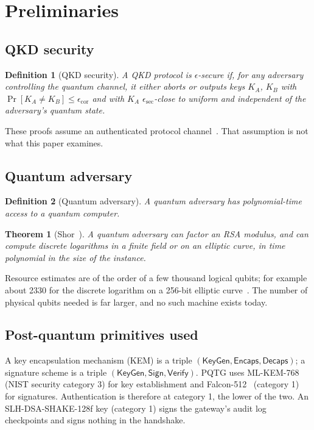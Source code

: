 \documentclass[11pt,letterpaper]{article}
\newtheorem{theorem}{Theorem}
\newtheorem{definition}{Definition}
\begin{document}
\section{Preliminaries}

\subsection{QKD security}

\begin{definition}[QKD security]
A QKD protocol is $\epsilon$-secure if, for any adversary controlling the quantum channel, it either aborts or outputs keys $K_A$, $K_B$ with $\Pr[K_A \neq K_B] \leq \epsilon_{\text{cor}}$ and with $K_A$ $\epsilon_{\text{sec}}$-close to uniform and independent of the adversary's quantum state.
\end{definition}

These proofs assume an authenticated protocol channel~\cite{shor2000simple}. That assumption is not what this paper examines.

\subsection{Quantum adversary}

\begin{definition}[Quantum adversary]
A quantum adversary has polynomial-time access to a quantum computer.
\end{definition}

\begin{theorem}[Shor~\cite{shor1997polynomial}]
\label{thm:shor}
A quantum adversary can factor an RSA modulus, and can compute discrete logarithms in a finite field or on an elliptic curve, in time polynomial in the size of the instance.
\end{theorem}

Resource estimates are of the order of a few thousand logical qubits; for example about 2330 for the discrete logarithm on a 256-bit elliptic curve~\cite{roetteler2017quantum}. The number of physical qubits needed is far larger, and no such machine exists today.

\subsection{Post-quantum primitives used}

A key encapsulation mechanism (KEM) is a triple $(\mathsf{KeyGen}, \mathsf{Encaps}, \mathsf{Decaps})$; a signature scheme is a triple $(\mathsf{KeyGen}, \mathsf{Sign}, \mathsf{Verify})$. PQTG uses ML-KEM-768~\cite{nist2024pqc} (NIST security category 3) for key establishment and Falcon-512~\cite{pornin2019falcon} (category 1) for signatures. Authentication is therefore at category 1, the lower of the two. An SLH-DSA-SHAKE-128f key (category 1) signs the gateway's audit log checkpoints and signs nothing in the handshake.
\end{document}
